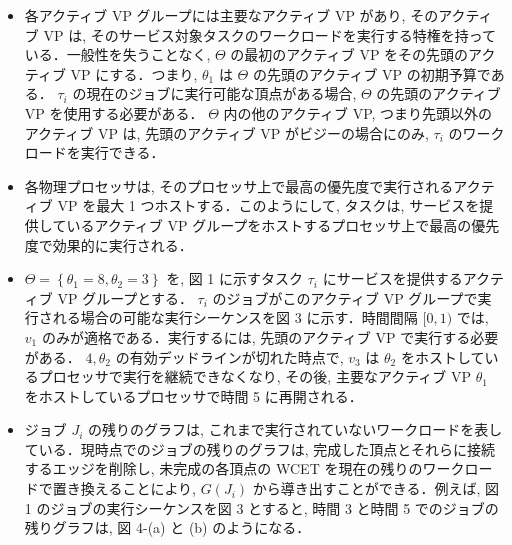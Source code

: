 \begin{frame}{}
    \begin{itemize}
        \item 各アクティブ VP グループには主要なアクティブ VP があり, そのアクティブ VP は, そのサービス対象タスクのワークロードを実行する特権を持っている．一般性を失うことなく, $\Theta$ の最初のアクティブ VP をその先頭のアクティブ VP にする．つまり, $\theta_{1}$ は $\Theta$ の先頭のアクティブ VP の初期予算である． $\tau_{i}$ の現在のジョブに実行可能な頂点がある場合, $\Theta$ の先頭のアクティブ VP を使用する必要がある． $\Theta$ 内の他のアクティブ VP, つまり先頭以外のアクティブ VP は, 先頭のアクティブ VP がビジーの場合にのみ, $\tau_{i}$ のワークロードを実行できる．
    \end{itemize}
\end{frame}

\begin{frame}{}
    \begin{itemize}
        \item 各物理プロセッサは, そのプロセッサ上で最高の優先度で実行されるアクティブ VP を最大 1 つホストする．このようにして, タスクは, サービスを提供しているアクティブ VP グループをホストするプロセッサ上で最高の優先度で効果的に実行される．
    \end{itemize}
\end{frame}

\begin{frame}{}
    \begin{itemize}
        \item $\Theta=\left\{\theta_{1}=8, \theta_{2}=3\right\}$ を, 図 1 に示すタスク $\tau_{i}$ にサービスを提供するアクティブ VP グループとする． $\tau_{i}$ のジョブがこのアクティブ VP グループで実行される場合の可能な実行シーケンスを図 3 に示す．時間間隔 $[0,1)$ では, $v_{1}$ のみが適格である．実行するには, 先頭のアクティブ VP で実行する必要がある． $4, \theta_{2}$ の有効デッドラインが切れた時点で, $v_{3}$ は $\theta_{2}$ をホストしているプロセッサで実行を継続できなくなり, その後, 主要なアクティブ VP $\theta_{1}$ をホストしているプロセッサで時間 5 に再開される．
    \end{itemize}
\end{frame}

\begin{frame}{}
    \begin{itemize}
        \item ジョブ $J_{i}$ の残りのグラフは, これまで実行されていないワークロードを表している．現時点でのジョブの残りのグラフは, 完成した頂点とそれらに接続するエッジを削除し, 未完成の各頂点の WCET を現在の残りのワークロードで置き換えることにより, $G\left(J_{i}\right)$ から導き出すことができる．例えば, 図 1 のジョブの実行シーケンスを図 3 とすると, 時間 3 と時間 5 でのジョブの残りグラフは, 図 4-(a) と (b) のようになる．
    \end{itemize}
\end{frame}

